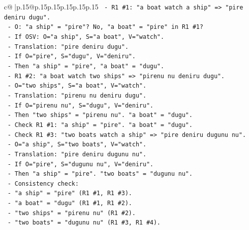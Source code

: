 \documentclass{article}
\begin{document}
{\begin{supertabular}{c@{$\;$}|p{.15\linewidth}@{}p{.15\linewidth}p{.15\linewidth}p{.15\linewidth}p{.15\linewidth}p{.15\linewidth}}
{{{\texttt{                    {-} R1 \#1: "a boat watch a ship" => "pire deniru dugu".} \\
\texttt{                      {-} O: "a ship" = "pire"? No, "a boat" = "pire" in R1 \#1?} \\
\texttt{                      {-} If OSV: O="a ship", S="a boat", V="watch".} \\
\texttt{                      {-} Translation: "pire deniru dugu".} \\
\texttt{                      {-} If O="pire", S="dugu", V="deniru".} \\
\texttt{                      {-} Then "a ship" = "pire", "a boat" = "dugu".} \\
\texttt{                    {-} R1 \#2: "a boat watch two ships" => "pirenu nu deniru dugu".} \\
\texttt{                      {-} O="two ships", S="a boat", V="watch".} \\
\texttt{                      {-} Translation: "pirenu nu deniru dugu".} \\
\texttt{                      {-} If O="pirenu nu", S="dugu", V="deniru".} \\
\texttt{                      {-} Then "two ships" = "pirenu nu". "a boat" = "dugu".} \\
\texttt{                      {-} Check R1 \#1: "a ship" = "pire". "a boat" = "dugu".} \\
\texttt{                      {-} Check R1 \#3: "two boats watch a ship" => "pire deniru dugunu nu".} \\
\texttt{                        {-} O="a ship", S="two boats", V="watch".} \\
\texttt{                        {-} Translation: "pire deniru dugunu nu".} \\
\texttt{                        {-} If O="pire", S="dugunu nu", V="deniru".} \\
\texttt{                        {-} Then "a ship" = "pire". "two boats" = "dugunu nu".} \\
\texttt{                        {-} Consistency check:} \\
\texttt{                          {-} "a ship" = "pire" (R1 \#1, R1 \#3).} \\
\texttt{                          {-} "a boat" = "dugu" (R1 \#1, R1 \#2).} \\
\texttt{                          {-} "two ships" = "pirenu nu" (R1 \#2).} \\
\texttt{                          {-} "two boats" = "dugunu nu" (R1 \#3, R1 \#4).} \\
}}}
\end{supertabular}}
\end{document}
